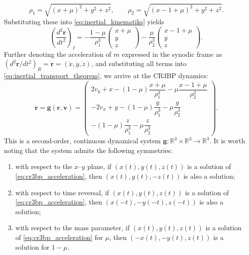 \[
    \rho_1 = \sqrt{(x+\mu)^2+y^2+z^2},
    \qquad
    \rho_2 = \sqrt{(x-1+\mu)^2+y^2+z^2}.
\]
Substituting these into \eqref{eq:inertial_kinematiks} yields
\[
    \left(\frac{d^2\boldsymbol{r}}{dt^2}\right)_I = -\frac{1-\mu}{\rho_1^3}
    \begin{pmatrix}
    x+\mu \\
    y \\
    z
    \end{pmatrix}
    -\frac{\mu}{\rho_2^3}
    \begin{pmatrix}
    x-1+\mu \\
    y \\
    z
    \end{pmatrix}.
\]
Further denoting the acceleration of $m$ expressed in the synodic frame as $(d^2 \boldsymbol{r}/dt^2)_R = \ddot{\boldsymbol{r}} = (\ddot{x}, \ddot{y}, \ddot{z})$, and substituting all terms into \eqref{eq:inertial_transport_theorem}, we arrive at the CR3BP dynamics:
\begin{equation} \label{eq:cr3bp_acceleration}
    \ddot{\boldsymbol{r}}
    =
    \boldsymbol{g}(\boldsymbol{r},\boldsymbol{v})
    =
    \begin{pmatrix}
        2v_y + x - (1-\mu)\dfrac{x+\mu}{\rho_1^3} - \mu\dfrac{x-1+\mu}{\rho_2^3} \\
        -2v_x + y - (1-\mu)\dfrac{y}{\rho_1^3} - \mu\dfrac{y}{\rho_2^3} \\
        -(1-\mu)\dfrac{z}{\rho_1^3} - \mu\dfrac{z}{\rho_2^3}
    \end{pmatrix}.
\end{equation}
This is a second-order, continuous dynamical system  $\boldsymbol{g}:\mathbb{R}^3\times\mathbb{R}^3 \rightarrow \mathbb{R}^3$. It is worth noting that the system admits the following symmetries:
\begin{enumerate}
    \item with respect to the $x$--$y$ plane, if $(x(t),y(t),z(t))$ is a solution of \eqref{eq:cr3bp_acceleration}, then \newline $(x(t),y(t),-z(t))$ is also a solution;
    \item with respect to time reversal, if $(x(t),y(t),z(t))$ is a solution of \eqref{eq:cr3bp_acceleration}, then \newline $(x(-t),-y(-t),z(-t))$ is also a solution;
    \item with respect to the mass parameter, if $(x(t),y(t),z(t))$ is a solution of \eqref{eq:cr3bp_acceleration} for $\mu$, then $(-x(t),-y(t),z(t))$ is a solution for $1-\mu$.
\end{enumerate}

